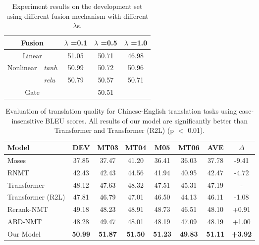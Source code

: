 \documentclass[11pt,a4paper]{article}
\begin{document}
\begin{CJK*}{UTF8}{gbsn}
\begin{table}
	\centering
	\begin{tabular}{|l|l||c|c|c|}
		\hline
		\multicolumn{2}{|c||}{Fusion}       &    $\lambda$ =0.1  &$\lambda$ =0.5   &$\lambda$ =1.0   \\
		\hline
		\hline
		\multicolumn{2}{|c||}{Linear}                  &     51.05     & 50.71 &  46.98    \\
		\hline
		\multirow{2}{*}{Nonlinear}        &\textit{tanh} &     50.99   &     50.72    &   50.96    \\  \cline{2-5}
		&\textit{relu} &     50.79   &     50.57      &   50.71         \\
		\hline
		\multicolumn{2}{|c||}{Gate}                    &      \multicolumn{3}{c|}{50.51}        \\
		\hline
	\end{tabular}
	\caption{Experiment results on the development set using different fusion mechanism with different $\lambda$s.} \label{acg-table}
\end{table}

\begin{table*}
	\centering
	\begin{tabular}{l|c|cccc|cc}
		\hline
		Model                 &  DEV      &MT03   &      MT04   &      M05     &      MT06       & AVE      &  $\Delta$ \\
		\hline
		\hline
		Moses             &  37.85     & 37.47     &    41.20     &       36.41    &    36.03        &     37.78   & -9.41   \\
		RNMT               &  42.43   &  42.43    &    44.56      &     41.94    &   40.95       &     42.47    &   -4.72\\
		Transformer     &  48.12   &  47.63    &    48.32     &       47.51     &   45.31       &     47.19    & -\\
		Transformer (R2L)  &   47.81    &  46.79     &    47.01      &      46.50   &   44.13       &     46.11    &  -1.08\\
		Rerank-NMT          &  49.18   &  48.23       & 48.91    &     48.73    & 46.51       &     48.10 &  +0.91 \\
		ABD-NMT           &   48.28 &  49.47     &       48.01        &       48.19        &      47.09    &   48.19    & +1.00 \\
		\hline
		\hline
		Our Model         &  \textbf{50.99}    &\textbf{51.87}        &     \textbf{51.50}   &        \textbf{51.23}    &    \textbf{49.83}    &  \textbf{51.11}  & \textbf{+3.92}   \\		
		\hline
	\end{tabular}
	\caption{Evaluation of translation quality for Chinese-English translation tasks using case-insensitive BLEU scores.
		All results of our model are significantly better than Transformer and Transformer (R2L) (p $<$ 0.01).
	} \label{CH-EN}
\end{table*}


\end{CJK*}
\end{document}
